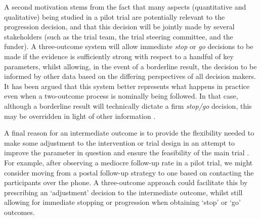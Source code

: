 \documentclass{bmcart}
\begin{document}

A second motivation stems from the fact that many aspects (quantitative and qualitative) being studied in a pilot trial are potentially relevant to the progression decision, and that this decision will be jointly made by several stakeholders (such as the trial team, the trial steering committee, and the funder). A three-outcome system will allow immediate \emph{stop} or \emph{go} decisions to be made if the evidence is sufficiently strong with respect to a handful of key parameters, whilst allowing, in the event of a borderline result, the decision to be informed by other data based on the differing perspectives of all decision makers. It has been argued that this system better represents what happens in practice even when a two-outcome process is nominally being followed. In that case, although a borderline result will technically dictate a firm \emph{stop/go} decision, this may be overridden in light of other information \cite{Sargent2001}.

A final reason for an intermediate outcome is to provide the flexibility needed to make some adjustment to the intervention or trial design in an attempt to improve the parameter in question and ensure the feasibility of the main trial%
. For example, after observing a mediocre follow-up rate in a pilot trial, we might consider moving from a postal follow-up strategy to one based on contacting the participants over the phone. A three-outcome approach could facilitate this by prescribing an `adjustment' decision to the intermediate outcome, whilst still allowing for immediate stopping or progression when obtaining `stop' or `go' outcomes. 
\end{document}
